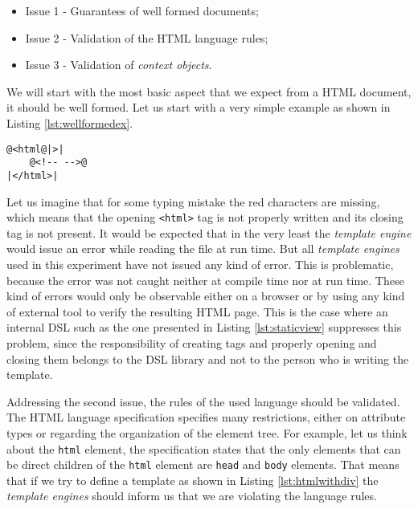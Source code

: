\begin{itemize}
	\item Issue 1 - Guarantees of well formed documents;
	\item Issue 2 - Validation of the \ac{HTML} language rules;
	\item Issue 3 - Validation of \textit{context objects}.
\end{itemize}

\noindent
We will start with the most basic aspect that we expect from a \ac{HTML} document, it should be well formed. Let us start with a very simple example as shown in Listing \ref{lst:wellformedex}.


\lstset{language = java}

\bigskip

\begin{minipage}{\linewidth}
\begin{lstlisting}[caption={Badly Formed HTML Document}, label={lst:wellformedex}, style=problemex]
@<html@|>|
	@<!-- -->@
|</html>|
\end{lstlisting}
\end{minipage} 

\noindent
Let us imagine that for some typing mistake the red characters are missing, which means that the opening \texttt{<html>} tag is not properly written and its closing tag is not present. It would be expected that in the very least the \textit{template engine} would issue an error while reading the file at run time. But all \textit{template engines} used in this experiment have not issued any kind of error. This is problematic, because the error was not caught neither at compile time nor at run time. These kind of errors would only be observable either on a browser or by using any kind of external tool to verify the resulting \ac{HTML} page. This is the case where an internal \ac{DSL} such as the one presented in Listing \ref{lst:staticview} suppresses this problem, since the responsibility of creating tags and properly opening and closing them belongs to the \ac{DSL} library and not to the person who is writing the template.

\noindent
Addressing the second issue, the rules of the used language should be validated. The \ac{HTML} language specification specifies many restrictions, either on attribute types or regarding the organization of the element tree. For example, let us think about the \texttt{html} element, the specification states that the only elements that can be direct children of the \texttt{html} element are \texttt{head} and \texttt{body} elements. That means that if we try to define a template as shown in Listing \ref{lst:htmlwithdiv} the \textit{template engines} should inform us that we are violating the language rules.

